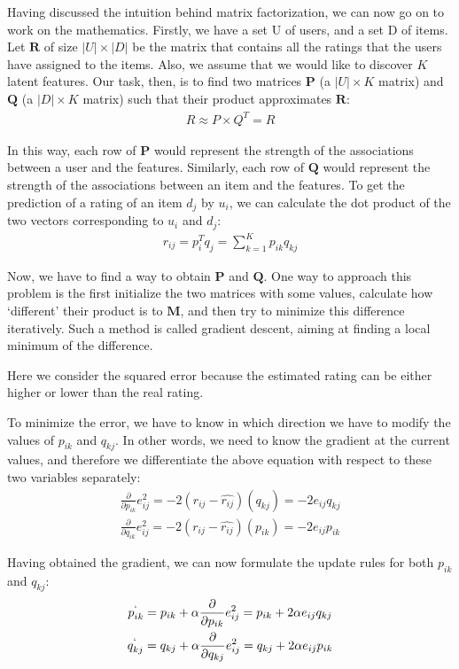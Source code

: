 Having discussed the intuition behind matrix factorization, we can now go on to work on the mathematics. Firstly, we have a set U of users, and a set D of items. Let $\mathbf{R}$ of size $|U| \times |D|$ be the matrix that contains all the ratings that the users have assigned to the items. Also, we assume that we would like to discover $K$ latent features. Our task, then, is to find two matrices $\mathbf{P}$ (a $|U| \times K$ matrix) and $\mathbf{Q}$ (a $|D| \times K$ matrix) such that their product approximates $\mathbf{R}$:
  \begin{gather*}
    R \approx P \times Q^{T} = \widehat{R}
  \end{gather*}

 In this way, each row of $\mathbf{P}$ would represent the strength of the associations between a user and the features. Similarly, each row of $\mathbf{Q}$ would represent the strength of the associations between an item and the features. To get the prediction of a rating of an item $d_j$ by $u_i$, we can calculate the dot product of the two vectors corresponding to $u_i$ and $d_j$:
  \begin{gather*}
    r_{ij} = p_i^{T}q_j = \sum_{k=1}^{K}p_{ik}q_{kj}
  \end{gather*}

 Now, we have to find a way to obtain $\mathbf{P}$ and $\mathbf{Q}$. One way to approach this problem is the first initialize the two matrices with some values, calculate how `different’ their product is to $\mathbf{M}$, and then try to minimize this difference iteratively. Such a method is called gradient descent, aiming at finding a local minimum of the difference.

 Here we consider the squared error because the estimated rating can be either higher or lower than the real rating.

 To minimize the error, we have to know in which direction we have to modify the values of $p_{ik}$ and $q_{kj}$. In other words, we need to know the gradient at the current values, and therefore we differentiate the above equation with respect to these two variables separately:
	\begin{gather*}
      \frac{\partial}{\partial p_{ik}}e_{ij}^2 = -2(r_{ij} - \widehat{r_{ij}})(q_{kj}) = -2e_{ij}q_{kj} \\
      \frac{\partial}{\partial q_{ik}}e_{ij}^2 = -2(r_{ij} - \widehat{r_{ij}})(p_{ik}) = -2e_{ij}p_{ik}
  \end{gather*}

 Having obtained the gradient, we can now formulate the update rules for both $p_{ik}$ and $q_{kj}$:
\begin{gather*}
      p^`_{ik} = p_{ik} + \alpha\frac{\partial}{\partial p_{ik}}e_{ij}^2 = p_{ik} + 2\alpha e_{ij}q_{kj} \\
      q^`_{kj} = q_{kj} + \alpha\frac{\partial}{\partial q_{kj}}e_{ij}^2 = q_{kj} + 2\alpha e_{ij}p_{ik}
  \end{gather*}

